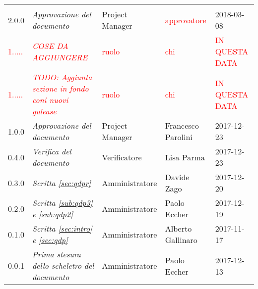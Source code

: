\newpage 
\section*{}
\begin{table}[H]
	\centering
	\begin{tabular}{p{2cm}|C{4cm}|C{3cm}|C{3cm}|R{2cm}}
		
		 & & & & \\
		

		2.0.0 & \emph{Approvazione del documento} & Project Manager & \textcolor{red}{approvatore} & 2018-03-08 \\
		\hline

		\textcolor{red}{1.....} & \emph{\textcolor{red}{COSE DA AGGIUNGERE}} & \textcolor{red}{ruolo} & \textcolor{red}{chi} & \textcolor{red}{IN QUESTA DATA} \\
		\hline

		\textcolor{red}{1.....} & \emph{\textcolor{red}{TODO: Aggiunta sezione in fondo coni nuovi gulease}}& \textcolor{red}{ruolo} & \textcolor{red}{chi} & \textcolor{red}{IN QUESTA DATA} \\
		\hline

		1.0.0 & \emph{Approvazione del documento} & Project Manager &  Francesco Parolini & 2017-12-23 \\
		\hline
		
		0.4.0  & \emph{Verifica del documento} & Verificatore & Lisa Parma & 2017-12-23 \\
		\hline
		
		0.3.0 & \emph{Scritta \ref{sec:qdpr}} & Amministratore & Davide Zago & 2017-12-20 \\
		\hline
		
		0.2.0 & \emph{Scritta \ref{sub:qdp3} e \ref{sub:qdp2}} &  Amministratore & Paolo Eccher & 2017-12-19 \\
		\hline
		
		0.1.0 & \emph{Scritta \ref{sec:intro} e \ref{sec:qdp}} & Amministratore & Alberto Gallinaro & 2017-11-17 \\
		\hline
		
		0.0.1 & \emph{Prima stesura dello scheletro del documento} & Amministratore & Paolo Eccher &  2017-12-13 \\
		
	\end{tabular}
	
\end{table}


\clearpage